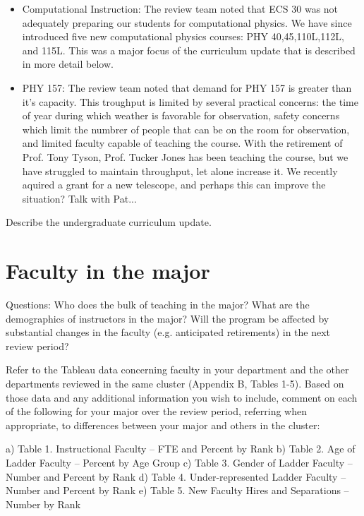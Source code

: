 \documentclass[12pt]{article}
\begin{document}
\begin{itemize}
\item Computational Instruction: The review team noted that ECS 30 was
  not adequately preparing our students for computational physics.  We
  have since introduced five new computational physics courses: PHY
  40,45,110L,112L, and 115L.  This was a major focus of the curriculum
  update that is described in more detail below.

\item PHY 157: The review team noted that demand for PHY 157 is
  greater than it's capacity.  This troughput is limited by several
  practical concerns: the time of year during which weather is
  favorable for observation, safety concerns which limit the numbrer
  of people that can be on the room for observation, and limited
  faculty capable of teaching the course.  With the retirement of
  Prof. Tony Tyson, Prof. Tucker Jones has been teaching the course,
  but we have struggled to maintain throughput, let alone increase it.
  We recently aquired a grant for a new telescope, and perhaps this
  can improve the situation?  Talk with Pat...

\end{itemize}

Describe the undergraduate curriculum update.


\section{Faculty in the major}
Questions: Who does the bulk of teaching in the major? What are the demographics of instructors in the major? Will the program be affected by substantial changes in the faculty (e.g. anticipated retirements) in the next review period?

Refer to the Tableau data concerning faculty in your department and the other departments reviewed in the same cluster (Appendix B, Tables 1-5). Based on those data and any additional information you wish to include, comment on each of the following for your major over the review period, referring when appropriate, to differences between your major and others in the cluster:

    a) Table 1.  Instructional Faculty – FTE and Percent by Rank 
    b) Table 2.  Age of Ladder Faculty – Percent by Age Group 
    c) Table 3.  Gender of Ladder Faculty – Number and Percent by Rank 
    d) Table 4.  Under-represented Ladder Faculty – Number and Percent by Rank 
    e) Table 5.  New Faculty Hires and Separations – Number by Rank 
\end{document}
